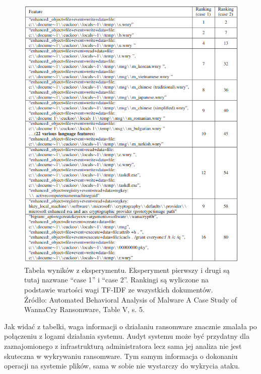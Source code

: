 \begin{figure}[H]
    \centering
    \includegraphics[width=0.85\linewidth]{rysunki/failed-exp.png}
    \caption{Tabela wyników z eksperymentu. Eksperyment pierwszy i drugi są tutaj nazwane \foreignquote{english}{case 1} i \foreignquote{english}{case 2}.
    Rankingi są wyliczone na podstawie wartości wagi TF-IDF ze wszystkich dokumentów. Źródło: 
    Automated Behavioral Analysis of Malware
A Case Study of WannaCry Ransomware, Table V, s. 5.}
    \label{fig:enter-label}
\end{figure}
Jak widać z tabelki, waga informacji o działaniu ransomware znacznie zmalała po połączeniu
z logami działania systemu. Audyt systemu może być przydatny dla zaznajomionego z infrastrukturą
administratora lecz sama jej analiza nie jest skuteczna w wykrywaniu ransomware. Tym samym
informacja o dokonaniu operacji na systemie plików, sama w sobie nie wystarczy do wykrycia ataku.
